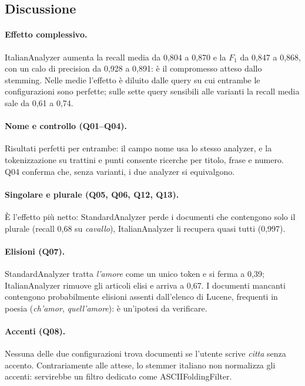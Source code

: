 \documentclass[10pt,a4paper,twocolumn]{article}
\newcommand{\cls}[1]{\textsf{#1}}
\begin{document}
\subsection{Discussione}
\paragraph{Effetto complessivo.} \cls{ItalianAnalyzer} aumenta la recall media da 0,804 a 0,870 e la $F_1$ da 0,847
a 0,868, con un calo di precision da 0,928 a 0,891: è il compromesso atteso dallo stemming. Nelle medie
l'effetto è diluito dalle query su cui entrambe le configurazioni sono perfette; sulle sette query sensibili alle
varianti la recall media sale da 0,61 a 0,74.

\paragraph{Nome e controllo (Q01--Q04).} Risultati perfetti per entrambe: il campo nome usa lo stesso
analyzer, e la tokenizzazione su trattini e punti consente ricerche per titolo, frase e numero. Q04 conferma
che, senza varianti, i due analyzer si equivalgono.

\paragraph{Singolare e plurale (Q05, Q06, Q12, Q13).} È l'effetto più netto: \cls{StandardAnalyzer} perde i
documenti che contengono solo il plurale (recall 0,68 su \emph{cavallo}), \cls{ItalianAnalyzer} li recupera quasi
tutti (0,997).

\paragraph{Elisioni (Q07).} \cls{StandardAnalyzer} tratta \emph{l'amore} come un unico token e si ferma a 0,39;
\cls{ItalianAnalyzer} rimuove gli articoli elisi e arriva a 0,67. I documenti mancanti contengono probabilmente
elisioni assenti dall'elenco di Lucene, frequenti in poesia (\emph{ch'amor}, \emph{quell'amore}): è
un'ipotesi da verificare.

\paragraph{Accenti (Q08).} Nessuna delle due configurazioni trova documenti se l'utente scrive \emph{citta} senza
accento. Contrariamente alle attese, lo stemmer italiano non normalizza gli accenti: servirebbe un filtro
dedicato come \cls{ASCIIFoldingFilter}.
\end{document}
